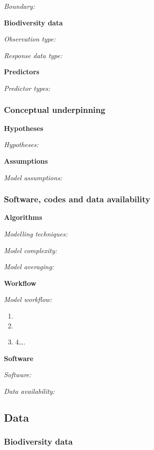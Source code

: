 \documentclass[11pt, a4paper]{article}
\providecommand{\tightlist}{%
  \setlength{\itemsep}{0pt}\setlength{\parskip}{0pt}}
\begin{document}
\emph{Boundary:}

\textbf{Biodiversity data}

\emph{Observation type:}

\emph{Response data type:}

\textbf{Predictors}

\emph{Predictor types:}

\hypertarget{conceptual-underpinning}{%
\subsubsection{Conceptual underpinning}\label{conceptual-underpinning}}

\textbf{Hypotheses}

\emph{Hypotheses:}

\textbf{Assumptions}

\emph{Model assumptions:}

\hypertarget{software-codes-and-data-availability}{%
\subsubsection{Software, codes and data
availability}\label{software-codes-and-data-availability}}

\textbf{Algorithms}

\emph{Modelling techniques:}

\emph{Model complexity:}

\emph{Model averaging:}

\textbf{Workflow}

\emph{Model workflow:}

\begin{enumerate}
\def\labelenumi{\arabic{enumi}.}
\tightlist
\item
\item
\item
  4\ldots.
\end{enumerate}

\textbf{Software}

\emph{Software:}

\emph{Data availability:}

\hypertarget{data}{%
\subsection{Data}\label{data}}

\hypertarget{biodiversity-data}{%
\subsubsection{Biodiversity data}\label{biodiversity-data}}
\end{document}
